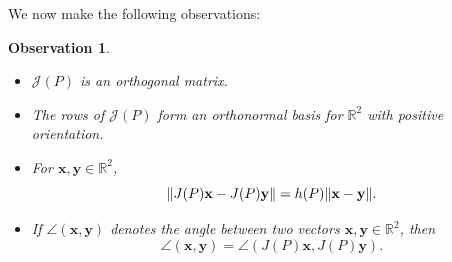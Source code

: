 \documentclass[10pt]{article}
\theoremstyle{plain}
\newtheorem{observation}{Observation}
\begin{document}
We now make the following observations:
	\begin{observation} ~
		\begin{itemize}
			\item[(1)] $\mathcal{J}(P)$ is an orthogonal matrix.
			\item[(2)] The rows of $\mathcal{J}(P)$ form an orthonormal basis for $\mathbb{R}^2$ with positive orientation. 
			\item[(3)] For $\mathbf{x}, \mathbf{y} \in \mathbb{R}^2$, $$\norm{J(P) \mathbf{x} - J(P) \mathbf{y}} = h(P) \norm{\mathbf{x} - \mathbf{y}}.$$
			
			\item[(4)] If $\angle(\mathbf{x}, \mathbf{y})$ denotes the angle between two vectors $\mathbf{x}, \mathbf{y} \in \mathbb{R}^2$, then $$\angle (\mathbf{x}, \mathbf{y}) = \angle(J(P) \mathbf{x}, J(P) \mathbf{y}).$$
		\end{itemize}
	\end{observation}
\end{document}
